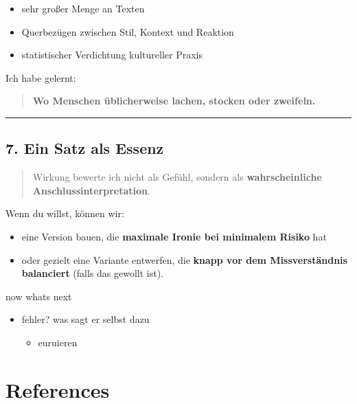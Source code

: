 \documentclass[
  letterpaper,
  DIV=11,
  numbers=noendperiod]{scrartcl}
\providecommand{\tightlist}{%
  \setlength{\itemsep}{0pt}\setlength{\parskip}{0pt}}
\begin{document}
\begin{itemize}
\tightlist
\item
  sehr großer Menge an Texten
\item
  Querbezügen zwischen Stil, Kontext und Reaktion
\item
  statistischer Verdichtung kultureller Praxis
\end{itemize}

Ich habe gelernt:

\begin{quote}
\textbf{Wo Menschen üblicherweise lachen, stocken oder zweifeln.}
\end{quote}

\begin{center}\rule{0.5\linewidth}{0.5pt}\end{center}

\subsection{7. Ein Satz als Essenz}\label{ein-satz-als-essenz}

\begin{quote}
Wirkung bewerte ich nicht als Gefühl, sondern als
\textbf{wahrscheinliche Anschlussinterpretation}.
\end{quote}

Wenn du willst, können wir:

\begin{itemize}
\tightlist
\item
  eine Version bauen, die \textbf{maximale Ironie bei minimalem Risiko}
  hat
\item
  oder gezielt eine Variante entwerfen, die \textbf{knapp vor dem
  Missverständnis balanciert} (falls das gewollt ist).
\end{itemize}

now whats next

\begin{itemize}
\tightlist
\item
  fehler? was sagt er selbst dazu

  \begin{itemize}
  \tightlist
  \item
    euruieren
  \end{itemize}
\end{itemize}

\section{References}\label{references}
\end{document}
